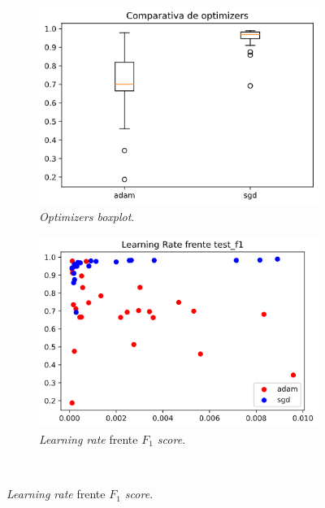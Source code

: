 \begin{figure}[H]
\begin{subfigure}[b]{.5\textwidth}
  \centering
  \includegraphics[width=.8\linewidth]{imagenes/06_Experimentacion/resnet/resnetboxplot.png}
  \caption{\textit{Optimizers boxplot}.}
  \label{fig:resnetoptimizers}
\end{subfigure}
\begin{subfigure}[b]{.5\textwidth}
  \centering
  \includegraphics[width=.8\linewidth]{imagenes/06_Experimentacion/resnet/resnetlr.png}
  \caption{\textit{Learning rate} frente \textit{$F_1$ score}.}
  \label{fig:resnetlr}
\end{subfigure}\\


\end{figure}
